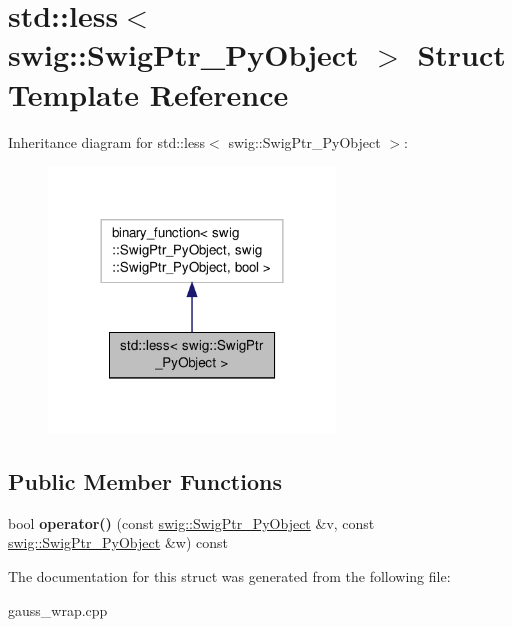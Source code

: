 \hypertarget{structstd_1_1less_3_01swig_1_1_swig_ptr___py_object_01_4}{\section{std\-:\-:less$<$ swig\-:\-:Swig\-Ptr\-\_\-\-Py\-Object $>$ Struct Template Reference}
\label{structstd_1_1less_3_01swig_1_1_swig_ptr___py_object_01_4}
}


Inheritance diagram for std\-:\-:less$<$ swig\-:\-:Swig\-Ptr\-\_\-\-Py\-Object $>$\-:\nopagebreak
\begin{figure}[H]
\begin{center}
\leavevmode
\includegraphics[width=216pt]{structstd_1_1less_3_01swig_1_1_swig_ptr___py_object_01_4__inherit__graph}
\end{center}
\end{figure}
\subsection*{Public Member Functions}
\begin{DoxyCompactItemize}
\item 
\hypertarget{structstd_1_1less_3_01swig_1_1_swig_ptr___py_object_01_4_a72561f398a851c407db5a61a1d672bab}{bool {\bfseries operator()} (const \hyperlink{classswig_1_1_swig_ptr___py_object}{swig\-::\-Swig\-Ptr\-\_\-\-Py\-Object} \&v, const \hyperlink{classswig_1_1_swig_ptr___py_object}{swig\-::\-Swig\-Ptr\-\_\-\-Py\-Object} \&w) const }\label{structstd_1_1less_3_01swig_1_1_swig_ptr___py_object_01_4_a72561f398a851c407db5a61a1d672bab}

\end{DoxyCompactItemize}


The documentation for this struct was generated from the following file\-:\begin{DoxyCompactItemize}
\item 
gauss\-\_\-wrap.\-cpp\end{DoxyCompactItemize}

